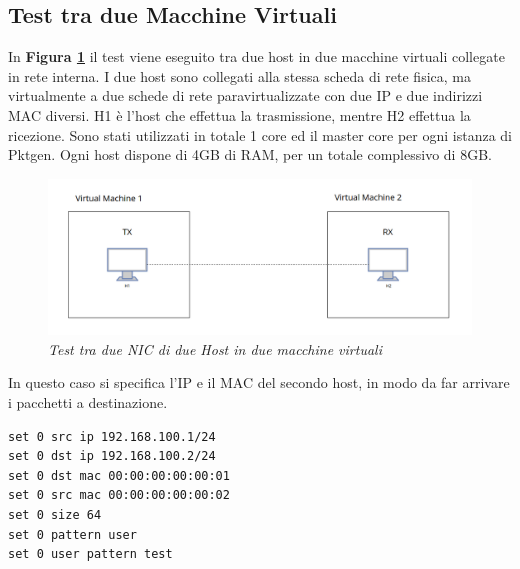\subsection*{Test tra due Macchine Virtuali}
In \textbf{{Figura \ref{fig:dpdk_vm2}}} il test viene eseguito tra due host in due macchine virtuali collegate in rete interna. I due host sono collegati alla stessa scheda di rete fisica, ma virtualmente a due schede di rete paravirtualizzate con due IP e due indirizzi MAC diversi. H1 è l'host che effettua la trasmissione, mentre H2 effettua la ricezione. Sono stati utilizzati in totale 1 core ed il master core per ogni istanza di Pktgen. Ogni host dispone di 4GB di RAM, per un totale complessivo di 8GB.
\FloatBarrier
\begin{figure}[h]
\includegraphics[scale=0.5]{images/dpdk_vm2.png}
\centering
\caption{\textit{Test tra due NIC di due Host in due macchine virtuali}}
\label{fig:dpdk_vm2}
\vspace{1cm}
\end{figure}
\FloatBarrier

In questo caso si specifica l'IP e il MAC del secondo host, in modo da far arrivare i pacchetti a destinazione.
\begin{verbatim}
set 0 src ip 192.168.100.1/24
set 0 dst ip 192.168.100.2/24
set 0 dst mac 00:00:00:00:00:01
set 0 src mac 00:00:00:00:00:02
set 0 size 64
set 0 pattern user
set 0 user pattern test
\end{verbatim}


